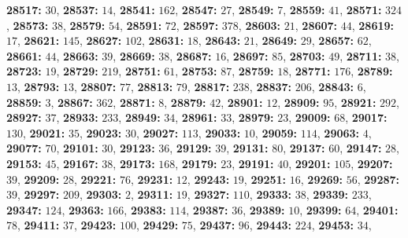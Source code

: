 \textsf{\bfseries 28517:} $30$, \textsf{\bfseries 28537:} $14$, \textsf{\bfseries 28541:} $162$, \textsf{\bfseries 28547:} $27$, \textsf{\bfseries 28549:} $7$, \textsf{\bfseries 28559:} $41$, \textsf{\bfseries 28571:} $324$, \textsf{\bfseries 28573:} $38$, \textsf{\bfseries 28579:} $54$, \textsf{\bfseries 28591:} $72$, \textsf{\bfseries 28597:} $378$, \textsf{\bfseries 28603:} $21$, \textsf{\bfseries 28607:} $44$, \textsf{\bfseries 28619:} $17$, \textsf{\bfseries 28621:} $145$, \textsf{\bfseries 28627:} $102$, \textsf{\bfseries 28631:} $18$, \textsf{\bfseries 28643:} $21$, \textsf{\bfseries 28649:} $29$, \textsf{\bfseries 28657:} $62$, \textsf{\bfseries 28661:} $44$, \textsf{\bfseries 28663:} $39$, \textsf{\bfseries 28669:} $38$, \textsf{\bfseries 28687:} $16$, \textsf{\bfseries 28697:} $85$, \textsf{\bfseries 28703:} $49$, \textsf{\bfseries 28711:} $38$, \textsf{\bfseries 28723:} $19$, \textsf{\bfseries 28729:} $219$, \textsf{\bfseries 28751:} $61$, \textsf{\bfseries 28753:} $87$, \textsf{\bfseries 28759:} $18$, \textsf{\bfseries 28771:} $176$, \textsf{\bfseries 28789:} $13$, \textsf{\bfseries 28793:} $13$, \textsf{\bfseries 28807:} $77$, \textsf{\bfseries 28813:} $79$, \textsf{\bfseries 28817:} $238$, \textsf{\bfseries 28837:} $206$, \textsf{\bfseries 28843:} $6$, \textsf{\bfseries 28859:} $3$, \textsf{\bfseries 28867:} $362$, \textsf{\bfseries 28871:} $8$, \textsf{\bfseries 28879:} $42$, \textsf{\bfseries 28901:} $12$, \textsf{\bfseries 28909:} $95$, \textsf{\bfseries 28921:} $292$, \textsf{\bfseries 28927:} $37$, \textsf{\bfseries 28933:} $233$, \textsf{\bfseries 28949:} $34$, \textsf{\bfseries 28961:} $33$, \textsf{\bfseries 28979:} $23$, \textsf{\bfseries 29009:} $68$, \textsf{\bfseries 29017:} $130$, \textsf{\bfseries 29021:} $35$, \textsf{\bfseries 29023:} $30$, \textsf{\bfseries 29027:} $113$, \textsf{\bfseries 29033:} $10$, \textsf{\bfseries 29059:} $114$, \textsf{\bfseries 29063:} $4$, \textsf{\bfseries 29077:} $70$, \textsf{\bfseries 29101:} $30$, \textsf{\bfseries 29123:} $36$, \textsf{\bfseries 29129:} $39$, \textsf{\bfseries 29131:} $80$, \textsf{\bfseries 29137:} $60$, \textsf{\bfseries 29147:} $28$, \textsf{\bfseries 29153:} $45$, \textsf{\bfseries 29167:} $38$, \textsf{\bfseries 29173:} $168$, \textsf{\bfseries 29179:} $23$, \textsf{\bfseries 29191:} $40$, \textsf{\bfseries 29201:} $105$, \textsf{\bfseries 29207:} $39$, \textsf{\bfseries 29209:} $28$, \textsf{\bfseries 29221:} $76$, \textsf{\bfseries 29231:} $12$, \textsf{\bfseries 29243:} $19$, \textsf{\bfseries 29251:} $16$, \textsf{\bfseries 29269:} $56$, \textsf{\bfseries 29287:} $39$, \textsf{\bfseries 29297:} $209$, \textsf{\bfseries 29303:} $2$, \textsf{\bfseries 29311:} $19$, \textsf{\bfseries 29327:} $110$, \textsf{\bfseries 29333:} $38$, \textsf{\bfseries 29339:} $233$, \textsf{\bfseries 29347:} $124$, \textsf{\bfseries 29363:} $166$, \textsf{\bfseries 29383:} $114$, \textsf{\bfseries 29387:} $36$, \textsf{\bfseries 29389:} $10$, \textsf{\bfseries 29399:} $64$, \textsf{\bfseries 29401:} $78$, \textsf{\bfseries 29411:} $37$, \textsf{\bfseries 29423:} $100$, \textsf{\bfseries 29429:} $75$, \textsf{\bfseries 29437:} $96$, \textsf{\bfseries 29443:} $224$, \textsf{\bfseries 29453:} $34$, 

